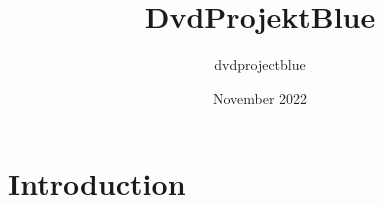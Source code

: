 \documentclass{article}
\title{DvdProjektBlue}
\author{dvdprojectblue}
\date{November 2022}
\begin{document}
\maketitle

\section{Introduction}








\end{document}
